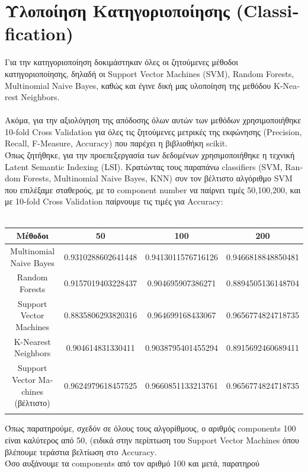 \documentclass{article}
\begin{document}
\section{Υλοποίηση Κατηγοριοποίησης \textlatin{(Classification)}}
Για την κατηγοριοποίηση δοκιμάστηκαν όλες οι ζητούμενες μέθοδοι κατηγοριοποίησης, δηλαδή οι 
\textlatin{Support Vector Machines (SVM), Random Forests, Multinomial Naive Bayes}, καθώς και 
έγινε δική μας υλοποίηση της μεθόδου \textlatin{K-Nearest Neighbors}.\\\\
Ακόμα, για την αξιολόγηση της απόδοσης όλων αυτών των μεθόδων χρησιμοποιήθηκε
\textlatin{10-fold Cross Validation} για όλες τις ζητούμενες μετρικές της εκφώνησης
\textlatin{(Precision, Recall, F-Measure, Accuracy)} που παρέχει η βιβλιοθήκη \textlatin{scikit}.\\
Όπως ζητήθηκε, για την προεπεξεργασία των δεδομένων χρησιμοποιήθηκε η τεχνική 
\textlatin{Latent Semantic Indexing (LSI)}. Κρατώντας τους παραπάνω \textlatin{classifiers} 
(\textlatin{SVM, Random Forests, Multinomial Naive Bayes, KNN}) συν τον βέλτιστο αλγόριθμο \textlatin{SVM} 
που επιλέξαμε σταθερούς, με το 
\textlatin{component number} να παίρνει τιμές 50,100,200, και με \textlatin{10-fold Cross Validation}
παίρνουμε τις τιμές για \textlatin{Accuracy}:\\\\

\renewcommand{\arraystretch}{2.5}
\begin{tabular}{ c c|c|c|}
\hline  
 Μέθοδοι & 50 & 100 & 200\\
\hline 
\textlatin{Multinomial Naive Bayes} & 0.9310288602641448 & 0.9413011576716126	 & 0.9466818848850481\\
\hline 
\textlatin{Random Forests} & 0.9157019403228437 & 0.904695907386271 & 0.8894505136148704\\
\hline
\textlatin{Support Vector Machines} & 0.8835806293820316 & 0.964699168433067 & 0.9656774824718735\\
\hline
\textlatin{K-Nearest Neighbors} & 0.904614831330411 & 0.9038795401455294 & 0.8915692460689411\\
\hline
\textlatin{Support Vector Machines} (βέλτιστο) & 0.9624979618457525 & 0.9660851133213761 & 0.9656774824718735\\
\hline\\
\end{tabular}

Όπως παρατηρούμε, σχεδόν σε όλους τους αλγορίθμους, ο αριθμός \textlatin{components} 100 είναι καλύτερος από 
50, (ειδικά στην περίπτωση του \textlatin{Support Vector Machines} όπου βλέπουμε τεράστια βελτίωση στο \textlatin{Accuracy}.\\
Όσο αυξάνουμε τα \textlatin{components} από τον αριθμό 100 και μετά, παρατηρού 
\end{document}
